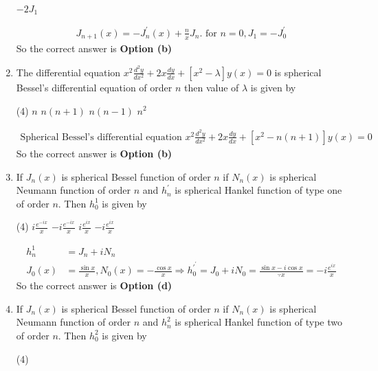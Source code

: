 \begin{enumerate}[label=\color{ocre}\textbf{\arabic*.}]
\begin{tasks}
	\task[\textbf{d.}]$-2 J_{1}$
\end{tasks}
\begin{answer}
	\begin{align*}
J_{n+1}(x)=-J_{n}^{\prime}(x)+\frac{n}{x} J_{n}\text{. for }n=0, J_{1}=-J_{0}^{\prime}
	\end{align*}
		So the correct answer is \textbf{Option (b)}
\end{answer}
\item  The differential equation $x^{2} \frac{d^{2} y}{d x^{2}}+2 x \frac{d y}{d x}+\left[x^{2}-\lambda\right] y(x)=0$ is spherical Bessel's differential equation of order $n$ then value of $\lambda$ is given by
 \begin{tasks}(4)
	\task[\textbf{a.}]$n$
	\task[\textbf{b.}]$n(n+1)$
	\task[\textbf{c.}] $n(n-1)$
	\task[\textbf{d.}]  $n^{2}$
\end{tasks}
\begin{answer}
	\begin{align*}
\text{Spherical Bessel's differential equation }x^{2} \frac{d^{2} y}{d x^{2}}+2 x \frac{d y}{d x}+\left[x^{2}-n(n+1)\right] y(x)=0
	\end{align*}
		So the correct answer is \textbf{Option (b)}
\end{answer}
\item If $J_{n}(x)$ is spherical Bessel function of order $n$ if $N_{n}(x)$ is spherical Neumann function of order $n$ and $h_{n}^{\prime}$ is spherical Hankel function of type one of order $n$. Then $h_{0}^{1}$ is given by
 \begin{tasks}(4)
	\task[\textbf{a.}]$i \frac{e^{-i x}}{x}$
	\task[\textbf{b.}]$-i \frac{e^{-i x}}{x}$
	\task[\textbf{c.}] $i \frac{e^{i x}}{x}$
	\task[\textbf{d.}] $-i \frac{e^{i x}}{x}$
\end{tasks}
\begin{answer}
	\begin{align*}
		h_{n}^{1}&=J_{n}+i N_{n}\\
	J_{0}(x)&=\frac{\sin x}{x}, N_{0}(x)=-\frac{\cos x}{x} \Rightarrow h_{0}^{\prime^{\prime}}=J_{0}+i N_{0}=\frac{\sin x-i \cos x}{\because x}=-i \frac{e^{i x}}{x}
	\end{align*}
	So the correct answer is \textbf{Option (d)}
\end{answer}
\item If $J_{n}(x)$ is spherical Bessel function of order $n$ if $N_{n}(x)$ is spherical Neumann function of order $n$ and $h_{n}^{2}$ is spherical Hankel function of type two of order $n$. Then $h_{0}^{2}$ is given by
 \begin{tasks}(4)

\end{tasks}
\end{enumerate}

